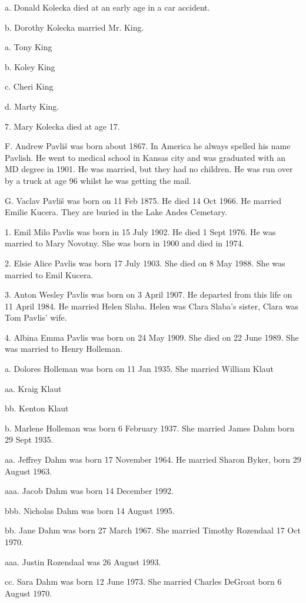 \documentclass[a4paper]{article}
\begin{document}
a. Donald Kolecka died  at an early age in a car accident.

b. Dorothy Kolecka married Mr. King.

a. Tony King

b. Koley King

c. Cheri King

d. Marty King.  

7. Mary Kolecka died at age 17.

F. Andrew Pavliš was born about 1867. In America he always spelled his name Pavlish.  He went to medical school in Kansas city and was graduated with an MD degree in 1901.  He was married, but they had no children.  He was run over by a truck at age 96 whilst he was getting the mail.

G. Vaclav Pavliš was born on 11 Feb 1875.  He died 14 Oct 1966.  He married Emilie Kucera.  They are buried in the Lake Andes Cemetary.    

1. Emil Milo Pavlis was born in 15 July 1902.  He died  1 Sept 1976.  He was married to Mary Novotny. She was born in 1900 and died in 1974.

2. Elsie Alice Pavlis was born 17 July 1903.  She died on 8 May 1988.  She was married to Emil Kucera.

3. Anton Wesley Pavlis was born on 3 April 1907.  He departed from this life on 11 April 1984.  He married Helen Slaba. Helen was Clara Slaba's sister, Clara was Tom Pavlis' wife. 

4. Albina Emma Pavlis was born on 24 May 1909.  She died on 22 June 1989. She was married to Henry Holleman.

a. Dolores Holleman was born on 11 Jan 1935.  She married William Klaut

aa. Kraig Klaut

bb. Kenton Klaut

b. Marlene Holleman was born 6 February 1937.  She married James Dahm born 29 Sept 1935.

aa. Jeffrey Dahm was born 17 November 1964. He married Sharon Byker, born 29 August 1963.

aaa. Jacob Dahm was born 14 December 1992.

bbb. Nicholas Dahm was born 14 August 1995.

bb. Jane Dahm was born 27 March 1967.  She married Timothy Rozendaal 17 Oct 1970. 

aaa. Justin Rozendaal was 26 August 1993.

cc. Sara Dahm was born 12 June 1973.  She married Charles DeGroat born 6 August 1970.
\end{document}
